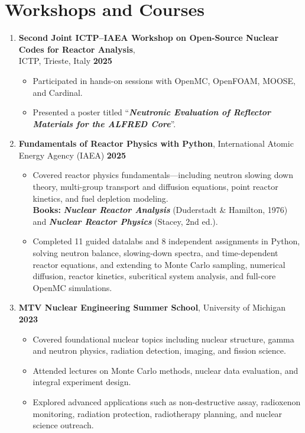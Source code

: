 \documentclass[9pt]{article}
\begin{document}
\section*{Workshops and Courses}\vspace{-4pt}
\begin{enumerate}
    \item \textbf{Second Joint ICTP–IAEA Workshop on Open-Source Nuclear Codes for Reactor Analysis},\\
    ICTP, Trieste, Italy \hfill \textbf{2025}
    \begin{itemize}\itemsep 0pt \parskip 0pt \parsep 0pt
        \item Participated in hands-on sessions with OpenMC, OpenFOAM, MOOSE, and Cardinal.
        \item Presented a poster titled ``\textbf{\textit{Neutronic Evaluation of Reflector Materials for the ALFRED Core}}''.
    \end{itemize}
    
    \item \textbf{Fundamentals of Reactor Physics with Python}, International Atomic Energy Agency (IAEA) \hfill \textbf{2025}
    \begin{itemize}\itemsep 0pt \parskip 0pt \parsep 0pt
        \item Covered reactor physics fundamentals—including neutron slowing down theory, multi-group transport and diffusion equations, point reactor kinetics, and fuel depletion modeling.\\ \textbf{Books:} \textbf{\textit{Nuclear Reactor Analysis}} (Duderstadt \& Hamilton, 1976) and \textbf{\textit{Nuclear Reactor Physics}} (Stacey, 2nd ed.). 
        \item Completed 11 guided datalabs and 8 independent assignments in Python, solving neutron balance, slowing-down spectra, and time-dependent reactor equations, and extending to Monte Carlo sampling, numerical diffusion, reactor kinetics, subcritical system analysis, and full-core OpenMC simulations.

    \end{itemize}

    \item \textbf{MTV Nuclear Engineering Summer School}, University of Michigan \hfill \textbf{2023}
    \begin{itemize}\itemsep 0pt \parskip 0pt \parsep 0pt
        \item Covered foundational nuclear topics including nuclear structure, gamma and neutron physics, radiation detection, imaging, and fission science.  
        \item Attended lectures on Monte Carlo methods, nuclear data evaluation, and integral experiment design.  
        \item Explored advanced applications such as non-destructive assay, radioxenon monitoring, radiation protection, radiotherapy planning, and nuclear science outreach.
    \end{itemize}


\end{enumerate}
\end{document}
